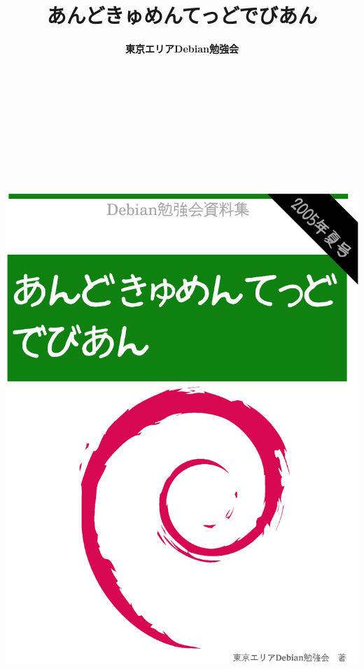 \documentclass[mingoth,a4paper]{jsarticle}
\begin{document}
\begin{titlepage}

\title{%
あんどきゅめんてっどでびあん}
\date{}
\author{\bf 東京エリアDebian勉強会} 

\includegraphics[height=252mm]{image200508/titlepage3.eps}
\end{titlepage}
\end{document}
